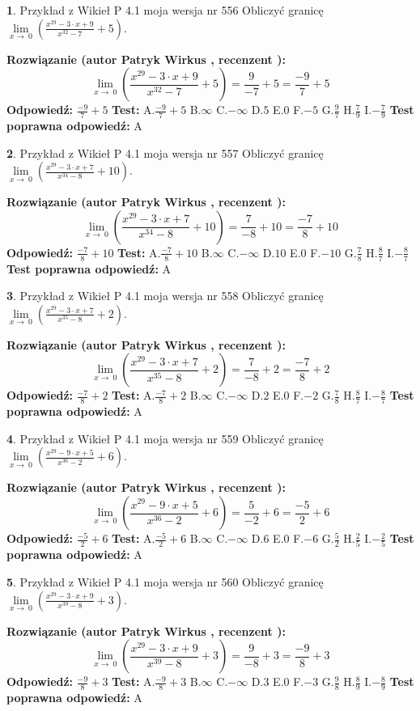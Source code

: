 \documentclass[12pt, a4paper]{article}
\theoremstyle{definition} %
\newtheorem{zad}{}
\newcommand{\zadStart}[1]{\begin{zad}#1\newline}
\newcommand{\zadStop}{\end{zad}}
\newcommand{\rozwStart}[2]{\noindent \textbf{Rozwiązanie (autor #1 , recenzent #2): }\newline}
\newcommand{\rozwStop}{\newline}
\newcommand{\odpStart}{\noindent \textbf{Odpowiedź:}\newline}
\newcommand{\odpStop}{\newline}
\newcommand{\testStart}{\noindent \textbf{Test:}\newline}
\newcommand{\testStop}{\newline}
\newcommand{\kluczStart}{\noindent \textbf{Test poprawna odpowiedź:}\newline}
\newcommand{\kluczStop}{\newline}
\begin{document}
\zadStart{Przykład z Wikieł P 4.1 moja wersja nr 556}
Obliczyć granicę $\lim\limits_{x\to\ 0}(\frac{x^{29}-3 \cdot x +9}{x^{32}-7}+5)$.
\zadStop
\rozwStart{Patryk Wirkus}{}
$$\lim\limits_{x\to\ 0}(\frac{x^{29}-3 \cdot x +9}{x^{32}-7}+5)=\frac{9}{-7}+5=\frac{-9}{7}+5$$
\rozwStop
\odpStart
$\frac{-9}{7}+5$
\odpStop
\testStart
A.$\frac{-9}{7}+5$
B.$\infty$
C.$-\infty$
D.$5$
E.$0$
F.$-5$
G.$\frac{9}{7}$
H.$\frac{7}{9}$
I.$-\frac{7}{9}$
\testStop
\kluczStart
A
\kluczStop



\zadStart{Przykład z Wikieł P 4.1 moja wersja nr 557}
Obliczyć granicę $\lim\limits_{x\to\ 0}(\frac{x^{29}-3 \cdot x +7}{x^{34}-8}+10)$.
\zadStop
\rozwStart{Patryk Wirkus}{}
$$\lim\limits_{x\to\ 0}(\frac{x^{29}-3 \cdot x +7}{x^{34}-8}+10)=\frac{7}{-8}+10=\frac{-7}{8}+10$$
\rozwStop
\odpStart
$\frac{-7}{8}+10$
\odpStop
\testStart
A.$\frac{-7}{8}+10$
B.$\infty$
C.$-\infty$
D.$10$
E.$0$
F.$-10$
G.$\frac{7}{8}$
H.$\frac{8}{7}$
I.$-\frac{8}{7}$
\testStop
\kluczStart
A
\kluczStop



\zadStart{Przykład z Wikieł P 4.1 moja wersja nr 558}
Obliczyć granicę $\lim\limits_{x\to\ 0}(\frac{x^{29}-3 \cdot x +7}{x^{35}-8}+2)$.
\zadStop
\rozwStart{Patryk Wirkus}{}
$$\lim\limits_{x\to\ 0}(\frac{x^{29}-3 \cdot x +7}{x^{35}-8}+2)=\frac{7}{-8}+2=\frac{-7}{8}+2$$
\rozwStop
\odpStart
$\frac{-7}{8}+2$
\odpStop
\testStart
A.$\frac{-7}{8}+2$
B.$\infty$
C.$-\infty$
D.$2$
E.$0$
F.$-2$
G.$\frac{7}{8}$
H.$\frac{8}{7}$
I.$-\frac{8}{7}$
\testStop
\kluczStart
A
\kluczStop



\zadStart{Przykład z Wikieł P 4.1 moja wersja nr 559}
Obliczyć granicę $\lim\limits_{x\to\ 0}(\frac{x^{29}-9 \cdot x +5}{x^{36}-2}+6)$.
\zadStop
\rozwStart{Patryk Wirkus}{}
$$\lim\limits_{x\to\ 0}(\frac{x^{29}-9 \cdot x +5}{x^{36}-2}+6)=\frac{5}{-2}+6=\frac{-5}{2}+6$$
\rozwStop
\odpStart
$\frac{-5}{2}+6$
\odpStop
\testStart
A.$\frac{-5}{2}+6$
B.$\infty$
C.$-\infty$
D.$6$
E.$0$
F.$-6$
G.$\frac{5}{2}$
H.$\frac{2}{5}$
I.$-\frac{2}{5}$
\testStop
\kluczStart
A
\kluczStop



\zadStart{Przykład z Wikieł P 4.1 moja wersja nr 560}
Obliczyć granicę $\lim\limits_{x\to\ 0}(\frac{x^{29}-3 \cdot x +9}{x^{39}-8}+3)$.
\zadStop
\rozwStart{Patryk Wirkus}{}
$$\lim\limits_{x\to\ 0}(\frac{x^{29}-3 \cdot x +9}{x^{39}-8}+3)=\frac{9}{-8}+3=\frac{-9}{8}+3$$
\rozwStop
\odpStart
$\frac{-9}{8}+3$
\odpStop
\testStart
A.$\frac{-9}{8}+3$
B.$\infty$
C.$-\infty$
D.$3$
E.$0$
F.$-3$
G.$\frac{9}{8}$
H.$\frac{8}{9}$
I.$-\frac{8}{9}$
\testStop
\kluczStart
A
\kluczStop
\end{document}
